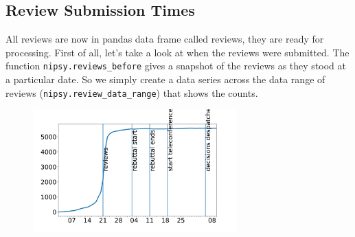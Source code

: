 \begin{Shaded}
\begin{Highlighting}[]

\end{Highlighting}
\end{Shaded}

\begin{Shaded}
\begin{Highlighting}[]
\OperatorTok{=}
\end{Highlighting}
\end{Shaded}

\hypertarget{review-submission-times}{%
\subsection{Review Submission Times}\label{review-submission-times}}

All reviews are now in pandas data frame called reviews, they are ready
for processing. First of all, let's take a look at when the reviews were
submitted. The function \texttt{nipsy.reviews\_before} gives a snapshot
of the reviews as they stood at a particular date. So we simply create a
data series across the data range of reviews
(\texttt{nipsy.review\_data\_range}) that shows the counts.

\begin{Shaded}
\begin{Highlighting}[]
\OperatorTok{=}\OperatorTok{=}
\OperatorTok{=}\NormalTok{ nipsy.reviews\_before(reviews, date).Quality.shape[}\NormalTok{]}
\end{Highlighting}
\end{Shaded}

\begin{figure}[htb]
\includegraphics[width=0.70\textwidth]{diagrams/neurips/review-count.pdf}


\caption{}
\label{review-count}
\end{figure}

